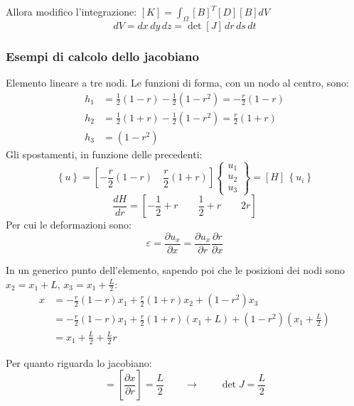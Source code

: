 Allora modifico l'integrazione: $[K]  =  \int_\Omega [B]^T[D][B]dV$
\begin{equation*}
    dV=dx\,dy\,dz=\det[J]\,dr\,ds\,dt
\end{equation*}

\subsubsection*{Esempi di calcolo dello jacobiano}
\begin{esempioBox}
    Elemento lineare a tre nodi.
    Le funzioni di forma, con un nodo al centro, sono:
    \begin{align*}
    h_1&=\frac{1}{2}(1-r)-\frac{1}{2}(1-r^2)=-\frac{r}{2}(1-r)\\
    h_2&=\frac{1}{2}(1+r)-\frac{1}{2}(1-r^2)=\frac{r}{2}(1+r)\\
    h_3&= (1-r^2)
\end{align*}
Gli spostamenti, in funzione delle precedenti:
\begin{equation*}
    \left\{u \right\} = \left[-\frac{r}{2}(1-r) \quad  \frac{r}{2}(1+r)\right]\begin{Bmatrix}
        u_1\\u_2\\u_3
    \end{Bmatrix}= [H] \,\left\{u_i \right\}
\end{equation*}
\begin{equation*}
    \frac{dH}{dr}=\left[-\frac{1}{2}+r\qquad\frac{1}{2}+r\qquad 2r \right]
\end{equation*}
Per cui le deformazioni sono:
\begin{equation*}
    \varepsilon=\frac{\partial u_x}{\partial x}=\frac{\partial u_x}{\partial r} \frac{\partial r}{\partial x}
\end{equation*}

In un generico punto dell'elemento, sapendo poi che le posizioni dei nodi sono $x_2=x_1+L$, $x_3=x_1+\frac{L}{2}$:
\begin{align*}
    x &= -\frac{r}{2}(1-r)x_1 + \frac{r}{2}(1+r)x_2 + (1-r^2)x_3\\
       &= -\frac{r}{2}(1-r)x_1 + \frac{r}{2}(1+r)(x_1+L) + (1-r^2)(x_1+\frac{L}{2})\\
       &= x_1+\frac{L}{2}+\frac{L}{2}r
\end{align*}

Per quanto riguarda lo jacobiano:
\begin{equation*}
    [J]= \left[\frac{\partial x}{\partial r} \right]=\frac{L}{2} \qquad \rightarrow\qquad \det J=\frac{L}{2}
\end{equation*}


\end{esempioBox}
